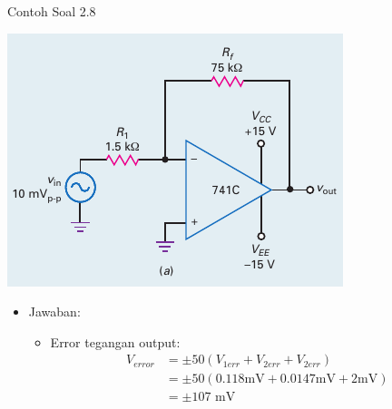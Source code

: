\begin{frame}{Contoh Soal 2.8}
	\begin{multicols}{2}
		\begin{center}
			\includegraphics[width=\linewidth]{gambar/fig-16.17a}
		\end{center}
		\columnbreak
		\begin{itemize}
			\item Jawaban:
			\begin{itemize}
				
				\item Error tegangan output:
				\begin{align*}
					V_{error} &= \pm 50 (V_{1err} + V_{2err} + V_{2err}) \\
					&= \pm 50 (0.118 \text{mV} + 0.0147 \text{mV} + 2 \text{mV}) \\
					&= \pm 107 \text{ mV}
				\end{align*}
			\end{itemize}
		\end{itemize}
	\end{multicols}
\end{frame}

